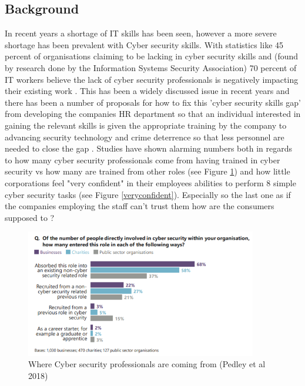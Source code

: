 \documentclass[12pt,a4paper]{article}
\begin{document}
\subsection{Background}  
In recent years a shortage of IT skills has been seen, however a more severe shortage has been prevalent with Cyber security skills. With statistics like 45 percent of organisations claiming to be lacking in cyber security skills and (found by research done by the Information Systems Security Association) 70 percent of IT workers believe the lack of cyber security professionals is negatively impacting their existing work \cite{smith2018intelligent}. This has been a widely discussed issue in recent years and there has been a number of proposals for how to fix this 'cyber security skills gap' from developing the companies HR department so that an individual interested in gaining the relevant skills is given the appropriate training by the company to advancing security technology and crime deterrence so that less personnel are needed to close the gap \cite{cobb2016mind}. Studies have shown \cite{pedley2018understanding} alarming numbers both in regards to how many cyber security professionals come from having trained in cyber security vs how many are trained from other roles (see Figure \ref{wherefrom}) and how little corporations feel "very confident" in their employees abilities to perform 8 simple cyber security tasks (see Figure \ref{veryconfident}). Especially so the last one as if the companies employing the staff can't trust them how are the consumers supposed to ?  

\begin{figure}[h]
    \centering
    \includegraphics[width=0.9\textwidth]{Figs/cyberskillswherefrom.PNG} 
    \caption{Where Cyber security professionals are coming from (Pedley et al 2018)}
    \label{wherefrom}
\end{figure} 
\end{document}
